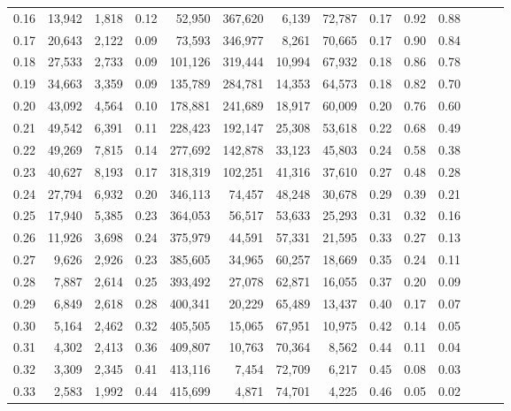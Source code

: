 \begin{tabular}{rrrrrrrrrrrrrr}
0.16 &  13,942 &  1,818 &  0.12 &   52,950 &  367,620 &   6,139 &  72,787 &  0.17 &  0.92 &      0.88 \\
0.17 &  20,643 &  2,122 &  0.09 &   73,593 &  346,977 &   8,261 &  70,665 &  0.17 &  0.90 &      0.84 \\
0.18 &  27,533 &  2,733 &  0.09 &  101,126 &  319,444 &  10,994 &  67,932 &  0.18 &  0.86 &      0.78 \\
0.19 &  34,663 &  3,359 &  0.09 &  135,789 &  284,781 &  14,353 &  64,573 &  0.18 &  0.82 &      0.70 \\
0.20 &  43,092 &  4,564 &  0.10 &  178,881 &  241,689 &  18,917 &  60,009 &  0.20 &  0.76 &      0.60 \\
0.21 &  49,542 &  6,391 &  0.11 &  228,423 &  192,147 &  25,308 &  53,618 &  0.22 &  0.68 &      0.49 \\
0.22 &  49,269 &  7,815 &  0.14 &  277,692 &  142,878 &  33,123 &  45,803 &  0.24 &  0.58 &      0.38 \\
0.23 &  40,627 &  8,193 &  0.17 &  318,319 &  102,251 &  41,316 &  37,610 &  0.27 &  0.48 &      0.28 \\
0.24 &  27,794 &  6,932 &  0.20 &  346,113 &   74,457 &  48,248 &  30,678 &  0.29 &  0.39 &      0.21 \\
0.25 &  17,940 &  5,385 &  0.23 &  364,053 &   56,517 &  53,633 &  25,293 &  0.31 &  0.32 &      0.16 \\
0.26 &  11,926 &  3,698 &  0.24 &  375,979 &   44,591 &  57,331 &  21,595 &  0.33 &  0.27 &      0.13 \\
0.27 &   9,626 &  2,926 &  0.23 &  385,605 &   34,965 &  60,257 &  18,669 &  0.35 &  0.24 &      0.11 \\
0.28 &   7,887 &  2,614 &  0.25 &  393,492 &   27,078 &  62,871 &  16,055 &  0.37 &  0.20 &      0.09 \\
0.29 &   6,849 &  2,618 &  0.28 &  400,341 &   20,229 &  65,489 &  13,437 &  0.40 &  0.17 &      0.07 \\
0.30 &   5,164 &  2,462 &  0.32 &  405,505 &   15,065 &  67,951 &  10,975 &  0.42 &  0.14 &      0.05 \\
0.31 &   4,302 &  2,413 &  0.36 &  409,807 &   10,763 &  70,364 &   8,562 &  0.44 &  0.11 &      0.04 \\
0.32 &   3,309 &  2,345 &  0.41 &  413,116 &    7,454 &  72,709 &   6,217 &  0.45 &  0.08 &      0.03 \\
0.33 &   2,583 &  1,992 &  0.44 &  415,699 &    4,871 &  74,701 &   4,225 &  0.46 &  0.05 &      0.02 \\

\end{tabular}
